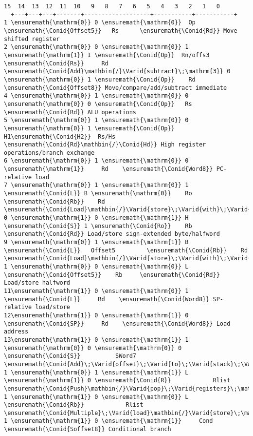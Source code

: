 \documentclass{article}
\newcommand{\Conid}[1]{\mathit{#1}}
\newcommand{\Varid}[1]{\mathit{#1}}
\begin{document}
\begin{Verbatim}[fontsize=\scriptsize]
   15  14  13  12  11  10   9   8   7   6   5   4   3   2   1   0
  +---+---+---+-------+-------------------+-----------+-----------+
1 \ensuremath{\mathrm{0}} 0 \ensuremath{\mathrm{0}}  Op   \ensuremath{\Conid{Offset5}}   Rs      \ensuremath{\Conid{Rd}} Move shifted register
2 \ensuremath{\mathrm{0}} 0 \ensuremath{\mathrm{0}} 1 \ensuremath{\mathrm{1}} I \ensuremath{\Conid{Op}}  Rn/offs3 \ensuremath{\Conid{Rs}}     Rd    \ensuremath{\Conid{Add}\mathbin{/}\Varid{subtract}\;\mathrm{3}} 0 \ensuremath{\mathrm{0}} 1 \ensuremath{\Conid{Op}}    Rd     \ensuremath{\Conid{Offset8}} Move/compare/add/subtract immediate
4 \ensuremath{\mathrm{0}} 1 \ensuremath{\mathrm{0}} 0 \ensuremath{\mathrm{0}} 0 \ensuremath{\Conid{Op}}   Rs      \ensuremath{\Conid{Rd}} ALU operations
5 \ensuremath{\mathrm{0}} 1 \ensuremath{\mathrm{0}} 0 \ensuremath{\mathrm{0}} 1 \ensuremath{\Conid{Op}} H1\ensuremath{\Conid{H2}}  Rs/Hs    \ensuremath{\Conid{Rd}\mathbin{/}\Conid{Hd}} High register operations/branch exchange
6 \ensuremath{\mathrm{0}} 1 \ensuremath{\mathrm{0}} 0 \ensuremath{\mathrm{1}}     Rd    \ensuremath{\Conid{Word8}} PC-relative load
7 \ensuremath{\mathrm{0}} 1 \ensuremath{\mathrm{0}} 1 \ensuremath{\Conid{L}} B \ensuremath{\mathrm{0}}    Ro     \ensuremath{\Conid{Rb}}    Rd     \ensuremath{\Conid{Load}\mathbin{/}\Varid{store}\;\Varid{with}\;\Varid{register}\;\Varid{offset}\;\mathrm{8}} 0 \ensuremath{\mathrm{1}} 0 \ensuremath{\mathrm{1}} H \ensuremath{\Conid{S}} 1 \ensuremath{\Conid{Ro}}    Rb     \ensuremath{\Conid{Rd}} Load/store sign-extended byte/halfword
9 \ensuremath{\mathrm{0}} 1 \ensuremath{\mathrm{1}} B \ensuremath{\Conid{L}}   Offset5         \ensuremath{\Conid{Rb}}    Rd     \ensuremath{\Conid{Load}\mathbin{/}\Varid{store}\;\Varid{with}\;\Varid{immediate}\;\Varid{offset}\;\mathrm{10}} 1 \ensuremath{\mathrm{0}} 0 \ensuremath{\mathrm{0}} L \ensuremath{\Conid{Offset5}}    Rb     \ensuremath{\Conid{Rd}} Load/store halfword
11\ensuremath{\mathrm{1}} 0 \ensuremath{\mathrm{0}} 1 \ensuremath{\Conid{L}}     Rd    \ensuremath{\Conid{Word8}} SP-relative load/store
12\ensuremath{\mathrm{1}} 0 \ensuremath{\mathrm{1}} 0 \ensuremath{\Conid{SP}}     Rd    \ensuremath{\Conid{Word8}} Load address
13\ensuremath{\mathrm{1}} 0 \ensuremath{\mathrm{1}} 1 \ensuremath{\mathrm{0}} 0 \ensuremath{\mathrm{0}} 0 \ensuremath{\Conid{S}}          SWord7           \ensuremath{\Conid{Add}\;\Varid{offset}\;\Varid{to}\;\Varid{stack}\;\Varid{pointer}\;\mathrm{14}} 1 \ensuremath{\mathrm{0}} 1 \ensuremath{\mathrm{1}} L \ensuremath{\mathrm{1}} 0 \ensuremath{\Conid{R}}            Rlist              \ensuremath{\Conid{Push}\mathbin{/}\Varid{pop}\;\Varid{registers}\;\mathrm{15}} 1 \ensuremath{\mathrm{1}} 0 \ensuremath{\mathrm{0}} L \ensuremath{\Conid{Rb}}            Rlist              \ensuremath{\Conid{Multiple}\;\Varid{load}\mathbin{/}\Varid{store}\;\mathrm{16}} 1 \ensuremath{\mathrm{1}} 0 \ensuremath{\mathrm{1}}     Cond      \ensuremath{\Conid{Soffset8}} Conditional branch

\end{Verbatim}
\end{document}
